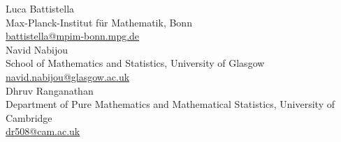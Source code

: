 \documentclass[11pt]{amsart}
\theoremstyle{definition}
\theoremstyle{definition}
\begin{document}



\bigskip\bigskip

\noindent Luca Battistella\\
Max-Planck-Institut f\"ur Mathematik, Bonn \\
\href{mailto:battistella@mpim-bonn.mpg.de}{battistella@mpim-bonn.mpg.de}\\

\noindent Navid Nabijou \\
School of Mathematics and Statistics, University of Glasgow \\
\href{mailto:Navid.Nabijou@glasgow.ac.uk}{navid.nabijou@glasgow.ac.uk}\\

\noindent Dhruv Ranganathan \\
Department of Pure Mathematics and Mathematical Statistics, University of Cambridge \\
\href{mailto:dr508@cam.ac.uk}{dr508@cam.ac.uk}
\end{document}
